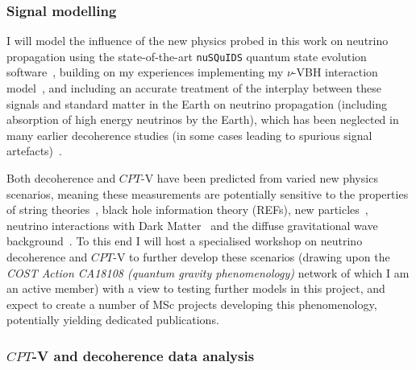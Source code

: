 \documentclass[a4paper,11pt]{article}
\begin{document}


\subsubsection{Signal modelling}

I will model the influence of the new physics probed in this work on neutrino propagation using the state-of-the-art \texttt{nuSQuIDS} quantum state evolution software~\cite{Delgado:2014kpa, nusquidsGIT}, building on my experiences implementing my $\nu$-VBH interaction model~\cite{PhysRevD.102.115003}, and including an accurate treatment of the interplay between these signals and standard matter in the Earth on neutrino propagation (including absorption of high energy neutrinos by the Earth), which has been neglected in many earlier decoherence studies (in some cases leading to spurious signal artefacts)~\cite{PhysRevD.97.115017}. 

Both decoherence and $CPT$-V have been predicted from varied new physics scenarios, meaning these measurements are potentially sensitive to the properties of string theories~\cite{Mavromatos2010, AmelinoCamelia:2008qg}, black hole information theory (REFs), new particles~\cite{Hellmann:2021jyz}, neutrino interactions with Dark Matter~\cite{1909.11271, EPJC802020, Capozzi:2018bps, 1904.02518} and the diffuse gravitational wave background~\cite{PhysRevD.100.096014}. To this end I will host a specialised workshop on neutrino decoherence and $CPT$-V to further develop these scenarios (drawing upon the \textit{COST Action CA18108 (quantum gravity phenomenology)} network of which I am an active member) with a view to testing further models in this project, and expect to create a number of MSc projects developing this phenomenology, potentially yielding dedicated publications. \\


\subsubsection{$CPT$-V and decoherence data analysis}
\end{document}
